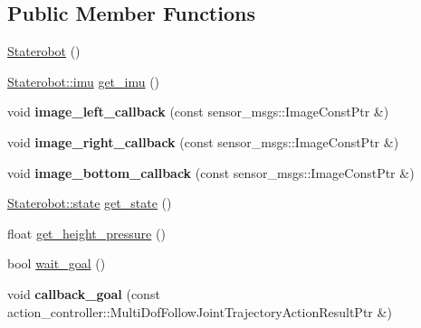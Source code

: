 \subsection*{\-Public \-Member \-Functions}
\begin{DoxyCompactItemize}
\item 
\hyperlink{class_staterobot_ab99a92f98d724c96989a744aee273155}{\-Staterobot} ()
\item 
\hyperlink{struct_staterobot_1_1imu}{\-Staterobot\-::imu} \hyperlink{class_staterobot_a05732dbb16bda2339b88a7c60fa2b7ad}{get\-\_\-imu} ()
\item 
\hypertarget{class_staterobot_a4cb41f60186d02b210f354d0199584a4}{void {\bfseries image\-\_\-left\-\_\-callback} (const sensor\-\_\-msgs\-::\-Image\-Const\-Ptr \&)}\label{class_staterobot_a4cb41f60186d02b210f354d0199584a4}

\item 
\hypertarget{class_staterobot_af908b8a70811f3c0a48efe323610602d}{void {\bfseries image\-\_\-right\-\_\-callback} (const sensor\-\_\-msgs\-::\-Image\-Const\-Ptr \&)}\label{class_staterobot_af908b8a70811f3c0a48efe323610602d}

\item 
\hypertarget{class_staterobot_a8ad49fe9f855e5874d8736067fa7fac0}{void {\bfseries image\-\_\-bottom\-\_\-callback} (const sensor\-\_\-msgs\-::\-Image\-Const\-Ptr \&)}\label{class_staterobot_a8ad49fe9f855e5874d8736067fa7fac0}

\item 
\hyperlink{struct_staterobot_1_1state}{\-Staterobot\-::state} \hyperlink{class_staterobot_a2dd739316c9cf438b13e21543aaff91f}{get\-\_\-state} ()
\item 
float \hyperlink{class_staterobot_a0318f7abf24c5c60aee915224af6af02}{get\-\_\-height\-\_\-pressure} ()
\item 
bool \hyperlink{class_staterobot_a4a44c24dd5cdb773aa40772d02b41720}{wait\-\_\-goal} ()
\item 
\hypertarget{class_staterobot_a37cbdfcb1cc30194f0fa0742952a0aad}{void {\bfseries callback\-\_\-goal} (const action\-\_\-controller\-::\-Multi\-Dof\-Follow\-Joint\-Trajectory\-Action\-Result\-Ptr \&)}\label{class_staterobot_a37cbdfcb1cc30194f0fa0742952a0aad}


\end{DoxyCompactItemize}
